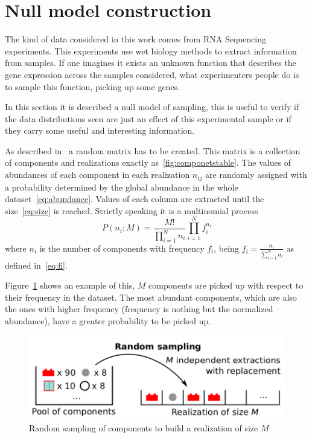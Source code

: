\section{Null model construction}\label{sec:nullmodel}
The kind of data considered in this work comes from RNA Sequencing experiments. This experiments use wet biology methods to extract information from samples. If one imagines it exists an unknown function that describes the gene expression across the samples considered, what experimenters people do is to sample  this function, picking up some genes.

In this section it is described a null model of sampling, this is useful to verify if the data distributions seen are just an effect of this experimental sample or if they carry some useful and interesting information.

As described in~\cite{mazzolini2018heaps} a random matrix has to be created. This matrix is a collection of components and realizations exactly as~\ref{fig:componetstable}. The values of abundances of each component in each realization $n_{i j}$ are randomly assigned with a probability determined by 
the global abundance in the whole dataset~\ref{eq:abundance}. Values of each column are extracted until the size~\ref{eq:size} is 
reached. Strictly speaking it is a multinomial process
\begin{equation}
P\left({n_i};M\right)=\frac{M!}{\prod_{i=1}^{N} n_i}\prod_{i=1}^N f_i^{n_i}
\end{equation}
where $n_i$ is the number of components with frequency $f_i$, being $f_i=\frac{a_i}{\sum_{i=1}^{N}a_{i}}$ as defined in~\ref{eq:fi}.

Figure~\ref{fig:structure/randomsampling} shows an example of this, $M$ components are picked up with respect to their frequency in the dataset. The most abundant components, which are also the ones with higher frequency (frequency is nothing but the normalized abundance), have a greater probability to be picked up.
\begin{figure}[htb!]
    \centering
    \includegraphics[width=0.8\linewidth]{pictures/structure/randomsampling.png}
    \caption{Random sampling of components to build a realization of size $M$}
    \label{fig:structure/randomsampling}
\end{figure}

